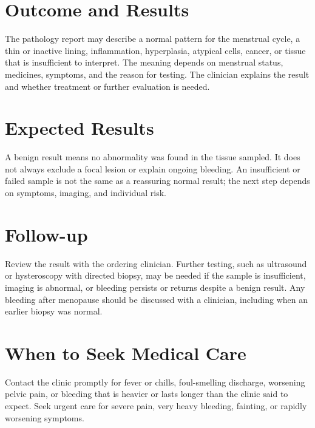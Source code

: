 \section*{Outcome and Results}
The pathology report may describe a normal pattern for the menstrual cycle, a thin or inactive lining, inflammation, hyperplasia, atypical cells, cancer, or tissue that is insufficient to interpret. The meaning depends on menstrual status, medicines, symptoms, and the reason for testing. The clinician explains the result and whether treatment or further evaluation is needed.

\section*{Expected Results}
A benign result means no abnormality was found in the tissue sampled. It does not always exclude a focal lesion or explain ongoing bleeding. An insufficient or failed sample is not the same as a reassuring normal result; the next step depends on symptoms, imaging, and individual risk.

\section*{Follow-up}
Review the result with the ordering clinician. Further testing, such as ultrasound or hysteroscopy with directed biopsy, may be needed if the sample is insufficient, imaging is abnormal, or bleeding persists or returns despite a benign result. Any bleeding after menopause should be discussed with a clinician, including when an earlier biopsy was normal.

\section*{When to Seek Medical Care}
Contact the clinic promptly for fever or chills, foul-smelling discharge, worsening pelvic pain, or bleeding that is heavier or lasts longer than the clinic said to expect. Seek urgent care for severe pain, very heavy bleeding, fainting, or rapidly worsening symptoms.

